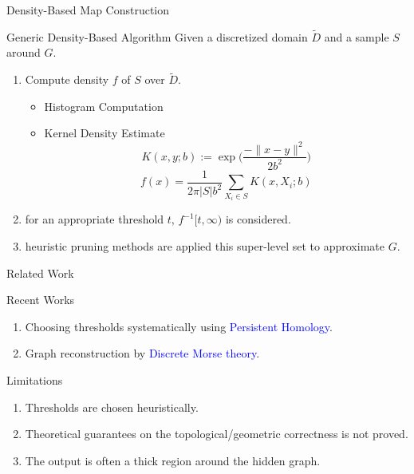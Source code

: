 \documentclass[9pt,sans-serif]{beamer}
\begin{document}
\begin{frame}{Density-Based Map Construction}
  \begin{block}{Generic Density-Based Algorithm}
    Given a discretized domain $\tilde D$ and a sample $S$ around $G$.
    \begin{enumerate}
    \item Compute density $f$ of $S$ over $\tilde D$. \\
      \pause
      \begin{itemize}
        \color{blue}
      \item
        {Histogram Computation}
      \item Kernel Density Estimate
        $$K(x,y;b):=\exp\bigg(\frac{-\|x-y\|^2}{2b^2}\bigg)$$
        $$f(x)=\frac{1}{2\pi |S|b^2}\sum_{X_i\in S} K(x,X_i;b)$$
      \end{itemize}
      \pause
    \item for an appropriate threshold $t$, $f^{-1}[t,\infty)$ is considered.
      \pause
    \item heuristic pruning methods are applied this super-level set to
      approximate $G$.
    \end{enumerate}
  \end{block}
\end{frame}

\begin{frame}{Related Work}
  \begin{block}{Recent Works}
    \begin{enumerate}
    \item Choosing thresholds systematically using
      \textcolor{blue}{Persistent Homology}.
      \cite{Ahmed:2015:CTD:2820783.2820810}
      \pause
    \item Graph reconstruction by \textcolor{blue}{Discrete Morse theory}.
      \cite{dey_graph_2018_socg}
    \end{enumerate}
  \end{block}

  \pause
  
  \begin{block}{Limitations}
    \begin{enumerate}
    \item Thresholds are chosen heuristically.
    \item Theoretical guarantees on the topological/geometric correctness is not
      proved.
    \item The output is often a thick region around the hidden graph.
    \end{enumerate}
  \end{block}
\end{frame}
\end{document}
